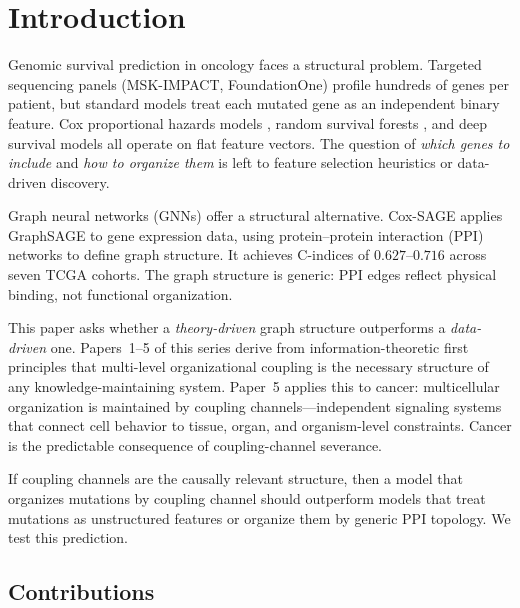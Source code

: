 \documentclass[11pt]{article}
\begin{document}
\section{Introduction}
\label{sec:intro}

Genomic survival prediction in oncology faces a structural
problem. Targeted sequencing panels (MSK-IMPACT, FoundationOne)
profile hundreds of genes per patient, but standard models treat
each mutated gene as an independent binary feature. Cox
proportional hazards models \cite{Cox1972}, random survival
forests \cite{Ishwaran2008}, and deep survival models
\cite{Katzman2018} all operate on flat feature vectors. The
question of \emph{which genes to include} and \emph{how to
organize them} is left to feature selection heuristics or
data-driven discovery.

Graph neural networks (GNNs) offer a structural alternative.
Cox-SAGE \cite{Bao2024} applies GraphSAGE to gene expression
data, using protein--protein interaction (PPI) networks to define
graph structure. It achieves C-indices of $0.627$--$0.716$ across
seven TCGA cohorts. The graph structure is generic: PPI edges
reflect physical binding, not functional organization.

This paper asks whether a \emph{theory-driven} graph structure
outperforms a \emph{data-driven} one. Papers~1--5 of this series
\cite{McCarthy2026a, McCarthy2026b, McCarthy2026c, McCarthy2026d,
McCarthy2026e} derive from information-theoretic first principles
that multi-level organizational coupling is the necessary structure
of any knowledge-maintaining system. Paper~5 \cite{McCarthy2026e}
applies this to cancer: multicellular organization is maintained by
coupling channels---independent signaling systems that connect cell
behavior to tissue, organ, and organism-level constraints. Cancer
is the predictable consequence of coupling-channel severance.

If coupling channels are the causally relevant structure, then a
model that organizes mutations by coupling channel should
outperform models that treat mutations as unstructured features
or organize them by generic PPI topology. We test this prediction.

\subsection{Contributions}
\end{document}
